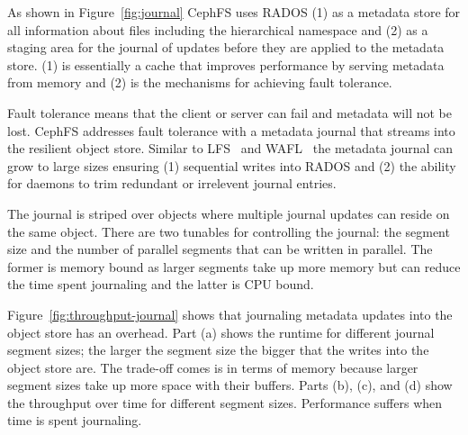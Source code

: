 
As shown in Figure~\ref{fig:journal} CephFS uses RADOS (1) as a metadata store
for all information about files including the hierarchical namespace and (2) as
a staging area for the journal of updates before they are applied to the
metadata store. (1) is essentially a cache that improves performance by serving
metadata from memory and (2) is the mechanisms for achieving fault tolerance. 

Fault tolerance means that the client or server can fail and metadata will not
be lost.  CephFS addresses fault tolerance with a metadata journal that streams
into the resilient object store. Similar to LFS~\cite{} and WAFL~\cite{} the
metadata journal can grow to large sizes ensuring (1) sequential writes into
RADOS and (2) the ability for daemons to trim redundant or irrelevent journal
entries. 

The journal is striped over objects where multiple journal updates can reside
on the same object. There are two tunables for controlling the journal: the
segment size and the number of parallel segments that can be written in
parallel. The former is memory bound as larger segments take up more memory but
can reduce the time spent journaling and the latter is CPU bound. 

Figure~\ref{fig:throughput-journal} shows that journaling metadata updates into
the object store has an overhead. Part (a) shows the runtime for different
journal segment sizes; the larger the segment size the bigger that the writes
into the object store are. The trade-off comes is in terms of memory because
larger segment sizes take up more space with their buffers. Parts (b), (c), and
(d) show the throughput over time for different segment sizes. Performance
suffers when time is spent journaling. 

